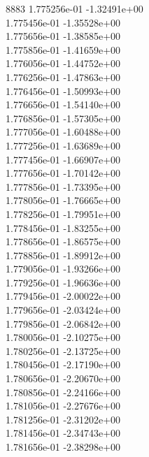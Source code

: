 8883	1.775256e-01	-1.32491e+00	\\ 	1.775456e-01	-1.35528e+00	\\ 	1.775656e-01	-1.38585e+00	\\ 	1.775856e-01	-1.41659e+00	\\ 	1.776056e-01	-1.44752e+00	\\ 	1.776256e-01	-1.47863e+00	\\ 	1.776456e-01	-1.50993e+00	\\ 	1.776656e-01	-1.54140e+00	\\ 	1.776856e-01	-1.57305e+00	\\ 	1.777056e-01	-1.60488e+00	\\ 	1.777256e-01	-1.63689e+00	\\ 	1.777456e-01	-1.66907e+00	\\ 	1.777656e-01	-1.70142e+00	\\ 	1.777856e-01	-1.73395e+00	\\ 	1.778056e-01	-1.76665e+00	\\ 	1.778256e-01	-1.79951e+00	\\ 	1.778456e-01	-1.83255e+00	\\ 	1.778656e-01	-1.86575e+00	\\ 	1.778856e-01	-1.89912e+00	\\ 	1.779056e-01	-1.93266e+00	\\ 	1.779256e-01	-1.96636e+00	\\ 	1.779456e-01	-2.00022e+00	\\ 	1.779656e-01	-2.03424e+00	\\ 	1.779856e-01	-2.06842e+00	\\ 	1.780056e-01	-2.10275e+00	\\ 	1.780256e-01	-2.13725e+00	\\ 	1.780456e-01	-2.17190e+00	\\ 	1.780656e-01	-2.20670e+00	\\ 	1.780856e-01	-2.24166e+00	\\ 	1.781056e-01	-2.27676e+00	\\ 	1.781256e-01	-2.31202e+00	\\ 	1.781456e-01	-2.34743e+00	\\ 	1.781656e-01	-2.38298e+00	\\ \hline
